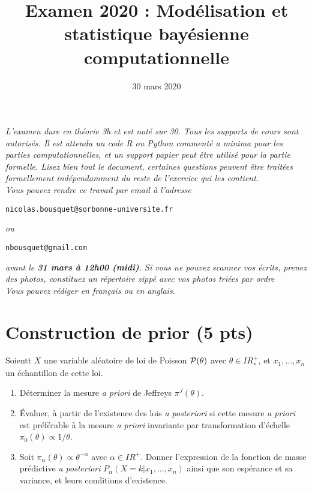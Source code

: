\documentclass[10pt]{article}
\title{Examen 2020 : Modélisation et statistique bayésienne computationnelle  }
\date{30 mars 2020}
\newcommand{\R}{I\!\!R}
\newcommand{\E}{\mbox{E}}
\newcommand{\V}{\mbox{Var}}
\newcommand{\1}{\mathbbm{1}}
\begin{document}
\maketitle

 




{\it L'examen dure en théorie 3h et est noté sur 30. Tous les supports de cours sont autorisés. Il est attendu un code R ou Python commenté {\it a minima} pour les parties computationnelles, et un support papier peut être utilisé pour la partie formelle. Lisez bien tout le document, certaines questions peuvent être traitées formellement indépendamment du reste de l'exercice qui les contient.} \\

{\it Vous pouvez rendre ce travail par email à l'adresse} 
\begin{center}
 \texttt{nicolas.bousquet@sorbonne-universite.fr} 
 \end{center} 
{\it ou }
 \begin{center}
 \texttt{nbousquet@gmail.com} 
  \end{center} 
{\it avant le {\bf 31 mars à 12h00 (midi)}. Si vous ne pouvez scanner vos écrits, prenez des photos, constituez un répertoire zippé avec vos photos triées par ordre} \\

 {\it Vous pouvez rédiger en fran\c cais ou en anglais.} \\ 


\section{Construction de prior (5 pts)}

Soientt $X$ une variable aléatoire de loi de Poisson ${\cal{P}}(\theta)$ avec $\theta\in\R^+_*$, et $x_1,\ldots,x_n$ un échantillon de cette loi.
\begin{enumerate}
\item Déterminer la mesure {\it a priori} de Jeffreys $\pi^J(\theta)$.
\item \'Evaluer, à partir de l'existence des lois {\it a posteriori} si cette mesure {\it a priori} est préférable à la mesure {\it a priori} invariante par transformation d'échelle $\pi_0(\theta)\propto1/\theta$.
\item Soit $\pi_{\alpha}(\theta) \propto \theta^{-\alpha}$ avec $\alpha\in\R^+$. Donner l'expression de la fonction de masse prédictive {\it a posteriori} $P_{\alpha}(X=k|x_1,\ldots,x_n)$ ainsi que son espérance et sa variance, et leurs conditions d'existence.
\end{enumerate}
\end{document}
